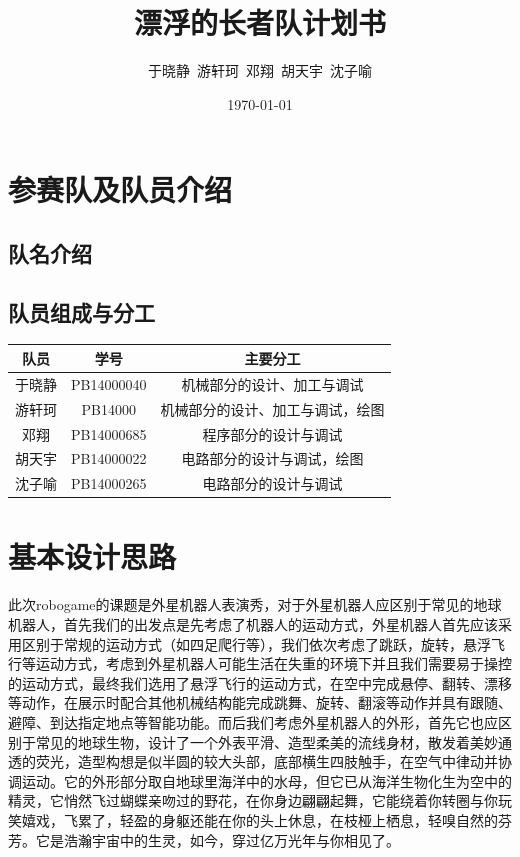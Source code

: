 \documentclass{ctexart}
\begin{document}

\title{漂浮的长者队计划书}
\author{于晓静\ 游轩珂\ 邓翔\ 胡天宇\ 沈子喻}
\date{\today}

\maketitle

\tableofcontents
\newpage
\section{参赛队及队员介绍}
\subsection{队名介绍}
\subsection{队员组成与分工}
\begin{center}
\begin{tabular}{|c|c|c|}
	\hline
	队员&学号&主要分工\\
	\hline
	于晓静&PB14000040&机械部分的设计、加工与调试\\
	\hline
	游轩珂&PB14000&机械部分的设计、加工与调试，绘图\\
	\hline
	邓翔&PB14000685&程序部分的设计与调试\\
	\hline
	胡天宇&PB14000022&电路部分的设计与调试，绘图\\
	\hline
	沈子喻&PB14000265&电路部分的设计与调试\\
	\hline
\end{tabular}
\end{center}

\section{基本设计思路}
此次robogame的课题是外星机器人表演秀，对于外星机器人应区别于常见的地球机器人，首先我们的出发点是先考虑了机器人的运动方式，外星机器人首先应该采用区别于常规的运动方式（如四足爬行等），我们依次考虑了跳跃，旋转，悬浮飞行等运动方式，考虑到外星机器人可能生活在失重的环境下并且我们需要易于操控的运动方式，最终我们选用了悬浮飞行的运动方式，在空中完成悬停、翻转、漂移等动作，在展示时配合其他机械结构能完成跳舞、旋转、翻滚等动作并具有跟随、避障、到达指定地点等智能功能。而后我们考虑外星机器人的外形，首先它也应区别于常见的地球生物，设计了一个外表平滑、造型柔美的流线身材，散发着美妙通透的荧光，造型构想是似半圆的较大头部，底部横生四肢触手，在空气中律动并协调运动。它的外形部分取自地球里海洋中的水母，但它已从海洋生物化生为空中的精灵，它悄然飞过蝴蝶亲吻过的野花，在你身边翩翩起舞，它能绕着你转圈与你玩笑嬉戏，飞累了，轻盈的身躯还能在你的头上休息，在枝桠上栖息，轻嗅自然的芬芳。它是浩瀚宇宙中的生灵，如今，穿过亿万光年与你相见了。
\end{document}
